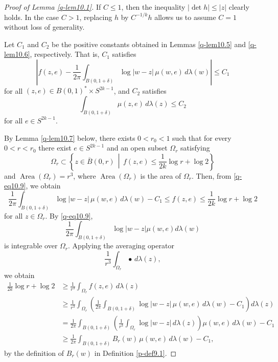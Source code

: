 \documentclass[12pt,twoside]{amsart}
\DeclareMathOperator{\Area}{Area}
\theoremstyle{definition}
\begin{document}
\begin{proof}[Proof of Lemma \ref{q-lem10.1}]
If $C \leq 1$, then the inequality $|\det h| \leq |z|$ clearly holds.  
In the case $C > 1$, replacing $h$ 
by $C^{-1/k} h$ allows us to assume $C = 1$ without loss of generality.

Let $C_1$ and $C_2$ be the positive 
constants obtained in Lemmas \ref{q-lem10.5} and \ref{q-lem10.6}, respectively.  
That is, $C_1$ satisfies
\begin{equation}\label{q-eq10.9}
\left| 
f(z,e) - \frac{1}{2\pi} \int_{B(0,1+\delta)} \log |w-z| \, \mu(w,e) \, d\lambda(w)
\right|
\le C_1
\end{equation}
for all $(z,e) \in B(0,1)^* \times S^{2k-1}$,  
and $C_2$ satisfies
\begin{equation}\label{q-eq10.10}
\int_{B(0,1+\delta)} \mu(z,e) \, d\lambda(z) \le C_2
\end{equation}
for all $e \in S^{2k-1}$.

By Lemma \ref{q-lem10.7} below, there exists $0 < r_0 < 1$ such that for every 
$0 < r < r_0$ 
there exist $e \in S^{2k-1}$ and an open subset $\Omega_r$ satisfying
\[
\Omega_r \subset \left\{ z \in \overline{B}(0, r) \,\middle|\, 
f(z, e) \leq \frac{1}{2k} \log r + \log 2 \right\}
\] 
and 
$\Area(\Omega_r) = r^3$, where $\Area(\Omega_r)$ is the 
area of $\Omega_r$. 
Then, from \eqref{q-eq10.9}, we obtain
\[
\frac{1}{2\pi} \int_{B(0,1+\delta)} \log |w-z| \, \mu(w,e) \, d\lambda(w) - C_1
\le f(z,e)
\le \frac{1}{2k} \log r + \log 2
\]
for all $z \in \Omega_r$. 
By \eqref{q-eq10.9}, 
\[
\frac{1}{2\pi} \int _{B(0, 1+\delta)} \log |w-z|\mu (w, e) d\lambda (w)
\] 
is integrable over $\Omega_r$. 
Applying the averaging operator
\[
\frac{1}{r^3} \int_{\Omega_r} \bullet \, d\lambda(z),
\]
we obtain
\begin{equation}\label{q-eq10.11}
\begin{split}
\frac{1}{2k} \log r + \log 2
&\ge \frac{1}{r^3} \int_{\Omega_r} f(z,e) \, d\lambda(z) \\
&\ge \frac{1}{r^3} \int_{\Omega_r} 
\left( 
\frac{1}{2\pi} \int_{B(0,1+\delta)} \log |w - z| \, \mu(w,e) \, d\lambda(w) - C_1
\right) d\lambda(z) \\
&= \frac{1}{2\pi} \int_{B(0,1+\delta)} 
\left( \frac{1}{r^3} \int_{\Omega_r} \log |w - z| \, d\lambda(z) \right)
\mu(w,e) \, d\lambda(w) - C_1 \\
&\ge \frac{1}{2\pi} \int_{B(0,1+\delta)} B_r(w) \, \mu(w,e) \, d\lambda(w) - C_1,
\end{split}
\end{equation}
by the definition of $B_r(w)$ in Definition \ref{p-def9.1}.


\end{proof}
\end{document}
